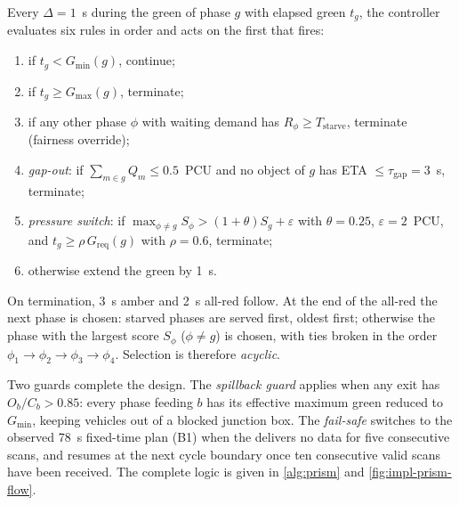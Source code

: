 Every $\Delta = 1$~s during the green of phase $g$ with elapsed green $t_g$, the controller evaluates
six rules in order and acts on the first that fires:
\begin{enumerate}[noitemsep]
  \item if $t_g < G_{\min}(g)$, continue;
  \item if $t_g \geq G_{\max}(g)$, terminate;
  \item if any other phase $\phi$ with waiting demand has $R_\phi \geq T_{\text{starve}}$, terminate
        (fairness override);
  \item \emph{gap-out}: if $\sum_{m\in g} Q_m \leq 0.5$~PCU and no object of $g$ has ETA
        $\leq \tau_{\text{gap}} = 3$~s, terminate;
  \item \emph{pressure switch}: if $\max_{\phi \neq g} S_\phi > (1+\theta) S_g + \varepsilon$ with
        $\theta = 0.25$, $\varepsilon = 2$~PCU, and $t_g \geq \rho\, G_{\text{req}}(g)$ with
        $\rho = 0.6$, terminate;
  \item otherwise extend the green by 1~s.
\end{enumerate}
On termination, 3~s amber and 2~s all-red follow. At the end of the all-red the next phase is chosen:
starved phases are served first, oldest first; otherwise the phase with the largest score $S_\phi$
($\phi \neq g$) is chosen, with ties broken in the order $\phi_1 \rightarrow \phi_2 \rightarrow \phi_3
\rightarrow \phi_4$.  Selection is therefore \emph{acyclic}. 

Two guards complete the design. The \emph{spillback guard} applies when any exit has
$O_b/C_b > 0.85$: every phase feeding $b$ has its effective maximum green reduced to $G_{\min}$, keeping vehicles out of a blocked junction box. The \emph{fail-safe} switches to the observed 78~s fixed-time plan
(B1) when the \vls{} delivers no data for five consecutive scans, and \prism{} resumes at the next
cycle boundary once ten consecutive valid scans have been received.  The complete logic is given in \cref{alg:prism} and
\cref{fig:impl-prism-flow}.

